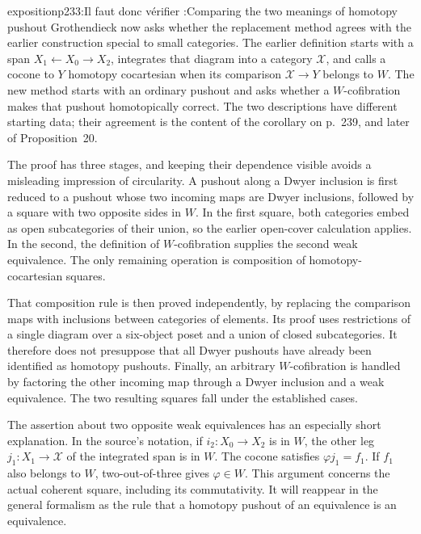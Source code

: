 \begin{dcomment}{exposition}{p233:Il faut donc vérifier :}{Comparing the two meanings of homotopy pushout}
Grothendieck now asks whether the replacement method agrees with the earlier construction special to small categories. The earlier definition starts with a span $X_1\leftarrow X_0\to X_2$, integrates that diagram into a category $\mathcal X$, and calls a cocone to $Y$ homotopy cocartesian when its comparison $\mathcal X\to Y$ belongs to $W$. The new method starts with an ordinary pushout and asks whether a $W$-cofibration makes that pushout homotopically correct. The two descriptions have different starting data; their agreement is the content of the corollary on p.~239, and later of Proposition~20.

The proof has three stages, and keeping their dependence visible avoids a misleading impression of circularity. A pushout along a Dwyer inclusion is first reduced to a pushout whose two incoming maps are Dwyer inclusions, followed by a square with two opposite sides in $W$. In the first square, both categories embed as open subcategories of their union, so the earlier open-cover calculation applies. In the second, the definition of $W$-cofibration supplies the second weak equivalence. The only remaining operation is composition of homotopy-cocartesian squares.

That composition rule is then proved independently, by replacing the comparison maps with inclusions between categories of elements. Its proof uses restrictions of a single diagram over a six-object poset and a union of closed subcategories. It therefore does not presuppose that all Dwyer pushouts have already been identified as homotopy pushouts. Finally, an arbitrary $W$-cofibration is handled by factoring the other incoming map through a Dwyer inclusion and a weak equivalence. The two resulting squares fall under the established cases.

The assertion about two opposite weak equivalences has an especially short explanation. In the source's notation, if $i_2:X_0\to X_2$ is in $W$, the other leg $j_1:X_1\to\mathcal X$ of the integrated span is in $W$. The cocone satisfies $\varphi j_1=f_1$. If $f_1$ also belongs to $W$, two-out-of-three gives $\varphi\in W$. This argument concerns the actual coherent square, including its commutativity. It will reappear in the general formalism as the rule that a homotopy pushout of an equivalence is an equivalence.
\end{dcomment}


